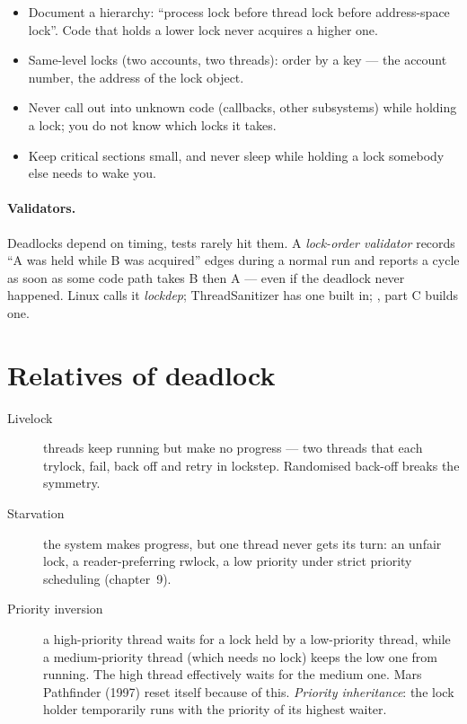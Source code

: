 \begin{itemize}
  \item Document a hierarchy: ``process lock before thread lock before
    address-space lock''. Code that holds a lower lock never acquires a
    higher one.
  \item Same-level locks (two accounts, two threads): order by a key ---
    the account number, the address of the lock object.
  \item Never call out into unknown code (callbacks, other subsystems)
    while holding a lock; you do not know which locks it takes.
  \item Keep critical sections small, and never sleep while holding a lock
    somebody else needs to wake you.
\end{itemize}

\paragraph{Validators.} Deadlocks depend on timing, tests rarely hit
them. A \emph{lock-order validator} records ``A was held while B was
acquired'' edges during a normal run and reports a cycle as soon as some
code path takes B then A --- even if the deadlock never happened. Linux
calls it \emph{lockdep}; ThreadSanitizer has one built in; ,
part C builds one.

\section{Relatives of deadlock}

\begin{description}
  \item[Livelock] threads keep running but make no progress --- two
    threads that each trylock, fail, back off and retry in lockstep.
    Randomised back-off breaks the symmetry.
  \item[Starvation] the system makes progress, but one thread never gets
    its turn: an unfair lock, a reader-preferring rwlock, a low priority
    under strict priority scheduling (chapter~9).
  \item[Priority inversion] a high-priority thread waits for a lock held
    by a low-priority thread, while a medium-priority thread (which needs
    no lock) keeps the low one from running. The high thread effectively
    waits for the medium one. Mars Pathfinder (1997) reset itself because
    of this. \emph{Priority inheritance}: the lock holder temporarily
    runs with the priority of its highest waiter.
\end{description}

